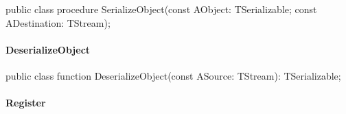 \documentclass{report}
\newif\ifpdf
\begin{document}
\label{PasDoc_Serialize.TSerializable-SerializeObject}
\begin{list}{}{
\setlength{\itemindent}{0cm}
\setlength{\listparindent}{0cm}
\setlength{\leftmargin}{\evensidemargin}
\addtolength{\leftmargin}{\tmplength}
\settowidth{\labelsep}{X}
\addtolength{\leftmargin}{\labelsep}
\setlength{\labelwidth}{\tmplength}
}
\item[\textbf{Declaration}\hfill]
\ifpdf
\begin{flushleft}
\fi
\begin{ttfamily}
public class procedure SerializeObject(const AObject: TSerializable; const ADestination: TStream);\end{ttfamily}

\ifpdf
\end{flushleft}
\fi

\end{list}
\paragraph*{DeserializeObject}\hspace*{\fill}

\label{PasDoc_Serialize.TSerializable-DeserializeObject}
\begin{list}{}{
\setlength{\itemindent}{0cm}
\setlength{\listparindent}{0cm}
\setlength{\leftmargin}{\evensidemargin}
\addtolength{\leftmargin}{\tmplength}
\settowidth{\labelsep}{X}
\addtolength{\leftmargin}{\labelsep}
\setlength{\labelwidth}{\tmplength}
}
\item[\textbf{Declaration}\hfill]
\ifpdf
\begin{flushleft}
\fi
\begin{ttfamily}
public class function DeserializeObject(const ASource: TStream): TSerializable;\end{ttfamily}

\ifpdf
\end{flushleft}
\fi

\end{list}
\paragraph*{Register}\hspace*{\fill}
\end{document}
